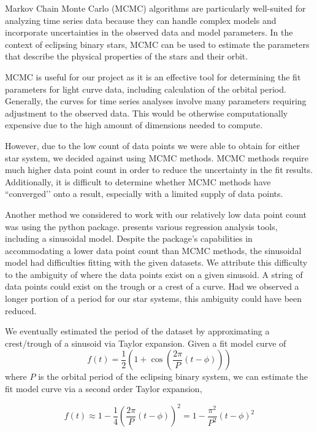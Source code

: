 \documentclass[12pt]{article}
\begin{document}
Markov Chain Monte Carlo (MCMC) algorithms are particularly well-suited for analyzing time series data because they can handle complex models and incorporate uncertainties in the observed data and model parameters. In the context of eclipsing binary stars, MCMC can be used to estimate the parameters that describe the physical properties of the stars and their orbit.

MCMC is useful for our project as it is an effective tool for determining the fit parameters for light curve data, including calculation of the orbital period. Generally, the curves for time series analyses involve many parameters requiring adjustment to the observed data. This would be otherwise computationally expensive due to the high amount of dimensions needed to compute.

However, due to the low count of data points we were able to obtain for either star system, we decided against using MCMC methods. MCMC methods require much higher data point count in order to reduce the uncertainty in the fit results. Additionally, it is difficult to determine whether MCMC methods have ``converged’’ onto a result, especially with a limited supply of data points.

Another method we considered to work with our relatively low data point count was using the  python package.  presents various regression analysis tools, including a sinusoidal model. Despite the package’s capabilities in accommodating a lower data point count than MCMC methods, the sinusoidal model had difficulties fitting with the given datasets. We attribute this difficulty to the ambiguity of where the data points exist on a given sinusoid. A string of data points could exist on the trough or a crest of a curve. Had we observed a longer portion of a period for our star systems, this ambiguity could have been reduced.


We eventually estimated the period of the dataset by approximating a crest/trough of a sinusoid via Taylor expansion. Given a fit model curve of
\begin{equation}
    f(t) = \frac{1}{2}\left(1 + \cos\left(\frac{2\pi}{P} (t - \phi) \right)\right)
\end{equation} 
where $P$ is the orbital period of the eclipsing binary system, we can estimate the fit model curve via a second order Taylor expansion, 

\begin{equation}
    f(t) \approx 1 - \frac{1}{4}\left( \frac{2\pi}{P}(t - \phi) \right)^{2} = 1 - \frac{\pi^2}{P^2}\left( t - \phi \right) ^2
\end{equation} 
\end{document}
